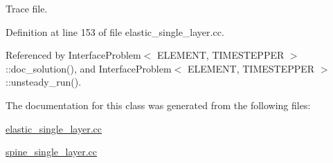 Trace file. 



Definition at line 153 of file elastic\+\_\+single\+\_\+layer.\+cc.



Referenced by Interface\+Problem$<$ E\+L\+E\+M\+E\+N\+T, T\+I\+M\+E\+S\+T\+E\+P\+P\+E\+R $>$\+::doc\+\_\+solution(), and Interface\+Problem$<$ E\+L\+E\+M\+E\+N\+T, T\+I\+M\+E\+S\+T\+E\+P\+P\+E\+R $>$\+::unsteady\+\_\+run().



The documentation for this class was generated from the following files\+:\begin{DoxyCompactItemize}
\item 
\hyperlink{elastic__single__layer_8cc}{elastic\+\_\+single\+\_\+layer.\+cc}\item 
\hyperlink{spine__single__layer_8cc}{spine\+\_\+single\+\_\+layer.\+cc}\end{DoxyCompactItemize}
